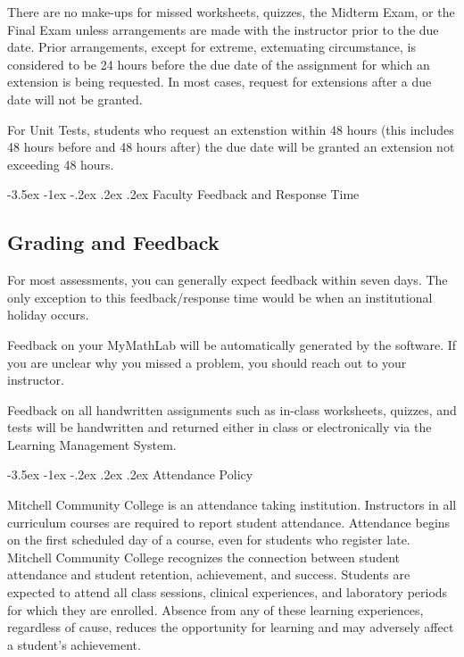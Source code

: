 \documentclass{article}
\makeatletter
\renewcommand\section{\@startsection{section}{1}{0pt}%
  {-3.5ex \@plus -1ex \@minus -.2ex}%
  {.2ex \@plus.2ex}%
  {\normalfont\Large\bfseries}} %
\makeatother
\begin{document}
There are no make-ups for missed worksheets, quizzes, the Midterm Exam, or the Final Exam unless arrangements are made with the instructor prior to the due date. Prior arrangements, except for extreme, extenuating circumstance, is considered to be 24 hours before the due date of the assignment for which an extension is being requested. In most cases, request for extensions after a due date will not be granted.

For Unit Tests, students who request an extenstion within 48 hours (this includes 48 hours before and 48 hours after) the due date will be granted an extension not exceeding 48 hours.

\section{Faculty Feedback and Response Time}

\subsection{Grading and Feedback}

For most assessments, you can generally expect feedback within seven days. The only exception to this feedback/response time would be when an institutional holiday occurs.

Feedback on your MyMathLab will be automatically generated by the software. If you are unclear why you missed a problem, you should reach out to your instructor.

Feedback on all handwritten assignments such as in-class worksheets, quizzes, and tests will be handwritten and returned either in class or electronically via the Learning Management System.

\section{Attendance Policy}

Mitchell Community College is an attendance taking institution. Instructors in all curriculum courses are required to report student attendance. Attendance begins on the first scheduled day of a course, even for students who register late. Mitchell Community College recognizes the connection between student attendance and student retention, achievement, and success. Students are expected to attend all class sessions, clinical experiences, and laboratory periods for which they are enrolled. Absence from any of these learning experiences, regardless of cause, reduces the opportunity for learning and may adversely affect a student's achievement.
\end{document}
